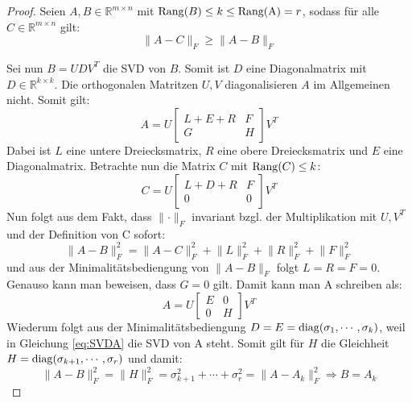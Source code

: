 \documentclass{article}
\newcommand{\R}[0]{\mathbb{R}}
\begin{document}
\begin{proof}
    Seien $A,B \in \R^{m \times n}$ mit ${\rm Rang}(B) \leq k \leq {\rm Rang(A)} = r$, sodass für alle $C \in \R^{m \times n}$ gilt: 
    \begin{equation*}
        \lVert A - C \rVert_F \geq \lVert A - B \rVert_F
    \end{equation*}

    Sei nun $B=U D V^T$ die SVD von $B$. Somit ist $D$ eine Diagonalmatrix mit $D \in \R^{k\times k}$. 
    Die orthogonalen Matritzen $U,V$ diagonalisieren $A$ im Allgemeinen nicht. Somit gilt:
    \begin{equation*}
        A = U \begin{bmatrix}
            L+E+R & F\\
            G & H
        \end{bmatrix} V^T
    \end{equation*} 
    Dabei ist $L$ eine untere Dreiecksmatrix, $R$ eine obere Dreiecksmatrix und $E$ eine Diagonalmatrix. Betrachte nun die Matrix $C$ mit ${\rm Rang}(C) \leq k$:
    \begin{equation*}
        C = U \begin{bmatrix}
            L+D+R & F \\
            0 & 0
        \end{bmatrix} V^T
    \end{equation*}
    Nun folgt aus dem Fakt, dass $\lVert \cdot \rVert_F$ invariant bzgl. der Multiplikation mit $U, V^T$ und der Definition von C sofort:
    \begin{equation*}
        \lVert A - B \rVert_F^2 = \lVert A-C \rVert_F^2 + \lVert L \rVert_F^2 + \lVert R \rVert_F^2 + \lVert F \rVert_F^2
    \end{equation*}
    und aus der Minimalitätsbediengung von $\lVert A - B \rVert_F$ folgt $L = R = F = 0$. Genauso kann man beweisen, dass $G = 0$ gilt. Damit kann man A schreiben als:
    \begin{equation}
        A = U \begin{bmatrix}
            E & 0 \\
            0 & H
        \end{bmatrix} V^T \label{eq:SVDA}
    \end{equation}
    Wiederum folgt aus der Minimalitätsbediengung $D = E = {\rm diag}(\sigma_1, \cdots, \sigma_k)$, weil in Gleichung \ref{eq:SVDA} die SVD von A steht.
    Somit gilt für $H$ die Gleichheit $H = {\rm diag}(\sigma_{k+1}, \cdots, \sigma_r)$ und damit:
    \begin{equation*}
        \lVert A - B \rVert_F^2 = \lVert H \rVert_F^2 = \sigma_{k+1}^2 + \cdots + \sigma_{r}^2 = \lVert A - A_k \rVert_F^2 \Rightarrow B = A_k 
    \end{equation*}

\end{proof}
\end{document}
